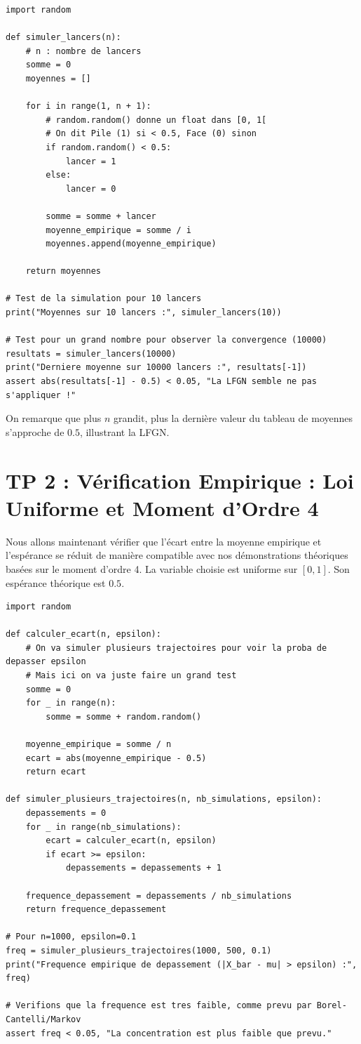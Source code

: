 \documentclass[11pt,a4paper]{article}
\begin{document}
\begin{lstlisting}
import random

def simuler_lancers(n):
    # n : nombre de lancers
    somme = 0
    moyennes = []

    for i in range(1, n + 1):
        # random.random() donne un float dans [0, 1[
        # On dit Pile (1) si < 0.5, Face (0) sinon
        if random.random() < 0.5:
            lancer = 1
        else:
            lancer = 0

        somme = somme + lancer
        moyenne_empirique = somme / i
        moyennes.append(moyenne_empirique)

    return moyennes

# Test de la simulation pour 10 lancers
print("Moyennes sur 10 lancers :", simuler_lancers(10))

# Test pour un grand nombre pour observer la convergence (10000)
resultats = simuler_lancers(10000)
print("Derniere moyenne sur 10000 lancers :", resultats[-1])
assert abs(resultats[-1] - 0.5) < 0.05, "La LFGN semble ne pas s'appliquer !"
\end{lstlisting}

On remarque que plus $n$ grandit, plus la dernière valeur du tableau de moyennes s'approche de $0.5$, illustrant la LFGN.


\section*{TP 2 : Vérification Empirique : Loi Uniforme et Moment d'Ordre 4}

Nous allons maintenant vérifier que l'écart entre la moyenne empirique et l'espérance se réduit de manière compatible avec nos démonstrations théoriques basées sur le moment d'ordre 4.
La variable choisie est uniforme sur $[0, 1]$. Son espérance théorique est $0.5$.

\begin{lstlisting}
import random

def calculer_ecart(n, epsilon):
    # On va simuler plusieurs trajectoires pour voir la proba de depasser epsilon
    # Mais ici on va juste faire un grand test
    somme = 0
    for _ in range(n):
        somme = somme + random.random()

    moyenne_empirique = somme / n
    ecart = abs(moyenne_empirique - 0.5)
    return ecart

def simuler_plusieurs_trajectoires(n, nb_simulations, epsilon):
    depassements = 0
    for _ in range(nb_simulations):
        ecart = calculer_ecart(n, epsilon)
        if ecart >= epsilon:
            depassements = depassements + 1

    frequence_depassement = depassements / nb_simulations
    return frequence_depassement

# Pour n=1000, epsilon=0.1
freq = simuler_plusieurs_trajectoires(1000, 500, 0.1)
print("Frequence empirique de depassement (|X_bar - mu| > epsilon) :", freq)

# Verifions que la frequence est tres faible, comme prevu par Borel-Cantelli/Markov
assert freq < 0.05, "La concentration est plus faible que prevu."
\end{lstlisting}
\end{document}
